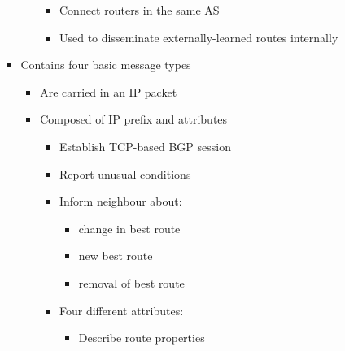\begin{itemize}
\begin{itemize}
\begin{itemize}
\begin{itemize}
                                \begin{itemize}
                                    \item Connect routers in the same AS
                                    \item Used to disseminate externally-learned routes internally
                                \end{itemize}
                        \end{itemize}
                    \item Contains four basic message types
                        \begin{itemize}
                            \item Are carried in an IP packet
                            \item Composed of IP prefix and attributes
                                \begin{itemize}
                                    \item Establish TCP-based BGP session
                                \end{itemize}
                                \begin{itemize}
                                    \item Report unusual conditions
                                \end{itemize}
                                \begin{itemize}
                                    \item Inform neighbour about:
                                        \begin{itemize}
                                            \item change in best route
                                            \item new best route
                                            \item removal of best route
                                        \end{itemize}
                                    \item Four different attributes:
                                        \begin{itemize}
                                            \item Describe route properties

\end{itemize}
\end{itemize}
\end{itemize}
\end{itemize}
\end{itemize}
\end{itemize}
